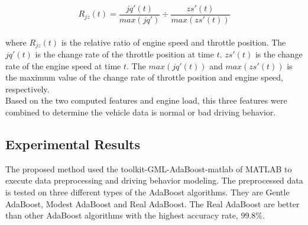 \begin{equation}
\label{eqa:ada_relative_eng_thr}
R_{jz}(t) = \dfrac{jq'(t)}{max(jq')} \div \dfrac{zs'(t)}{max(zs'(t))}
\end{equation}
\\
where $R_{jz}(t)$ is the relative ratio of engine speed and throttle position. The $jq'(t)$ is the change rate of the throttle position at time $t$. $zs'(t)$ is the change rate of the engine speed at time $t$. The $max(jq'(t))$ and $max(zs'(t))$ is the maximum value of the change rate of throttle position and engine speed, respectively.\\

Based on the two computed features and engine load, this three features were combined to determine the vehicle data is normal or bad driving behavior.

\subsection{Experimental Results}
The proposed method used the toolkit-GML-AdaBoost-matlab of MATLAB to execute data preprocessing and driving behavior modeling. The preprocessed data is tested on three different types of the AdaBoost algorithms. They are Gentle AdaBoost, Modest AdaBoost and Real AdaBoost. The Real AdaBoost are better than other AdaBoost algorithms with the highest accuracy rate, 99.8\%.